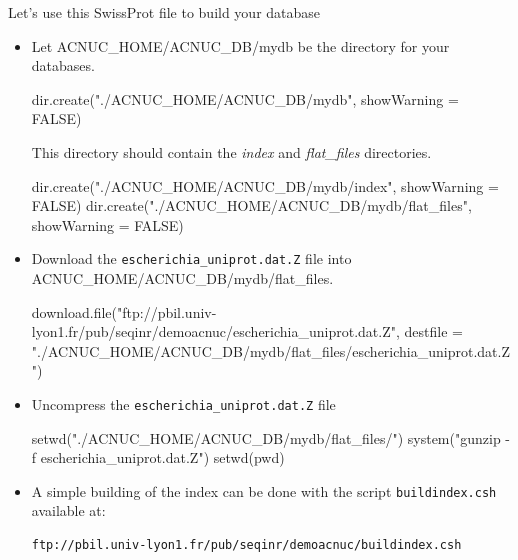 \documentclass{article}
\begin{document}
Let's use this SwissProt file to build your database
\begin{itemize}

\item Let ACNUC\_HOME/ACNUC\_DB/mydb be the directory for your databases.


\begin{Schunk}
\begin{Sinput}
 dir.create("./ACNUC_HOME/ACNUC_DB/mydb", showWarning = FALSE)
\end{Sinput}
\end{Schunk}
This directory should contain the  \textit{index} and \textit{flat\_files} directories.

\begin{Schunk}
\begin{Sinput}
 dir.create("./ACNUC_HOME/ACNUC_DB/mydb/index", showWarning = FALSE)
 dir.create("./ACNUC_HOME/ACNUC_DB/mydb/flat_files", showWarning = FALSE)
\end{Sinput}
\end{Schunk}

\item Download the \texttt{escherichia\_uniprot.dat.Z} file into ACNUC\_HOME/ACNUC\_DB/mydb/flat\_files.

\begin{Schunk}
\begin{Sinput}
 download.file("ftp://pbil.univ-lyon1.fr/pub/seqinr/demoacnuc/escherichia_uniprot.dat.Z",
 destfile = "./ACNUC_HOME/ACNUC_DB/mydb/flat_files/escherichia_uniprot.dat.Z")
\end{Sinput}
\end{Schunk}


\item Uncompress the \texttt{escherichia\_uniprot.dat.Z} file 

\begin{Schunk}
\begin{Sinput}
 setwd("./ACNUC_HOME/ACNUC_DB/mydb/flat_files/")
 system("gunzip -f escherichia_uniprot.dat.Z")
 setwd(pwd)
\end{Sinput}
\end{Schunk}


\item A simple building of the index can be done with the script  \texttt{buildindex.csh} available at:

\begin{verbatim}
ftp://pbil.univ-lyon1.fr/pub/seqinr/demoacnuc/buildindex.csh
\end{verbatim}



\end{itemize}
\end{document}
